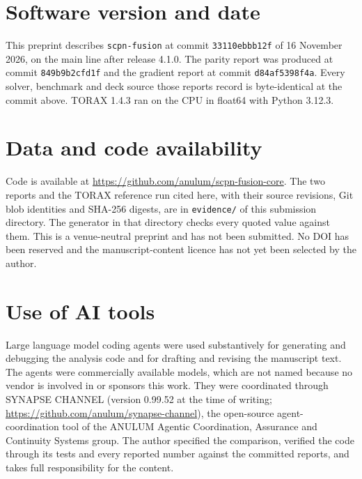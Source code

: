 \documentclass[11pt]{article}
\begin{document}
\section*{Software version and date}

This preprint describes \texttt{scpn-fusion} at commit \texttt{33110ebbb12f}
of 16 November 2026, on the main line after release 4.1.0.  The parity report
was produced at commit \texttt{849b9b2cfd1f} and the gradient report at
commit \texttt{d84af5398f4a}.  Every solver, benchmark and deck source those
reports record is byte-identical at the commit above.  TORAX 1.4.3 ran on the
CPU in float64 with Python 3.12.3.

\section*{Data and code availability}

Code is available at \url{https://github.com/anulum/scpn-fusion-core}.  The two
reports and the TORAX reference run cited here, with their source revisions,
Git blob identities and SHA-256 digests, are in \texttt{evidence/} of this
submission directory.  The generator in that directory checks every quoted
value against them.  This is a venue-neutral preprint and has not been
submitted.  No DOI has been reserved and the manuscript-content licence has not
yet been selected by the author.

\section*{Use of AI tools}

Large language model coding agents were used substantively for generating and
debugging the analysis code and for drafting and revising the manuscript text.
The agents were commercially available models, which are not named because no
vendor is involved in or sponsors this work.  They were coordinated through
SYNAPSE CHANNEL (version 0.99.52 at the time of writing;
\url{https://github.com/anulum/synapse-channel}), the open-source
agent-coordination tool of the ANULUM Agentic Coordination, Assurance and
Continuity Systems group.  The author specified the comparison, verified the
code through its tests and every reported number against the committed
reports, and takes full responsibility for the content.


\end{document}

